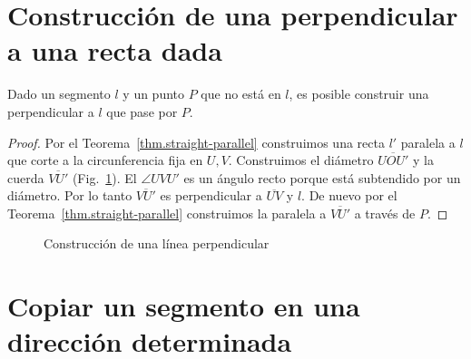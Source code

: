 \section{Construcción de una perpendicular a una recta dada}\label{s.perp}

\begin{theorem}\label{thm.straight-perp}
Dado un segmento $l$ y un punto $P$ que no está en $l$, es posible construir una perpendicular a $l$ que pase por $P$.
\end{theorem}

\begin{proof}
Por el Teorema~\ref{thm.straight-parallel} construimos una recta $l'$ paralela a $l$ que corte a la circunferencia fija en $U,V$. Construimos el diámetro $\overline{UOU'}$ y la cuerda $\overline{VU'}$ (Fig.~\ref{f.se-perp}). El $\angle UVU'$ es un ángulo recto porque está subtendido por un diámetro. Por lo tanto $\overline{VU'}$ es perpendicular a $\overline{UV}$ y $l$. De nuevo por el Teorema~\ref{thm.straight-parallel} construimos la paralela a $\overline{VU'}$ a través de $P$.
\end{proof}

\begin{figure}[htb]
\begin{center}
\end{center}
\caption{Construcción de una línea perpendicular}\label{f.se-perp}
\end{figure}

\section{Copiar un segmento en una dirección determinada}\label{s.copy}

